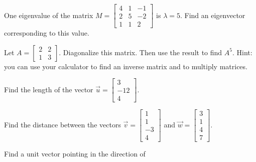 \documentclass[12pt]{exam}
\begin{document}
\begin{questions}
\question
One eigenvalue of the matrix $M =
\left[ \begin{array}{ccc}
4 & 1 & -1 \\ 2 & 5 & -2 \\ 1 & 1 & 2
\end{array}
\right]$
is $\lambda = 5$.  Find an eigenvector corresponding to this value.

\question
Let $A =
\left[ \begin{array}{cc}
2 & 2 \\ 1 & 3
\end{array}
\right]$.  Diagonalize this matrix.  Then use the result to find $A^{5}$.  Hint: you can use your calculator to find an inverse matrix and to multiply matrices.

\question
Find the length of the vector $\vec{u} = \left[ \begin{array}{c} 3 \\ -12 \\ 4 \end{array} \right]$.

\question
Find the distance between the vectors 
$\vec{v} = \left[ \begin{array}{c} 1 \\ 1 \\ -3 \\ 4 \end{array} \right]$ and 
$\vec{w} = \left[ \begin{array}{c} 3 \\ 1 \\ 4 \\ 7 \end{array} \right]$. 

\question
Find a unit vector pointing in the direction of
\begin{parts}
\end{parts}


\end{questions}
\end{document}
